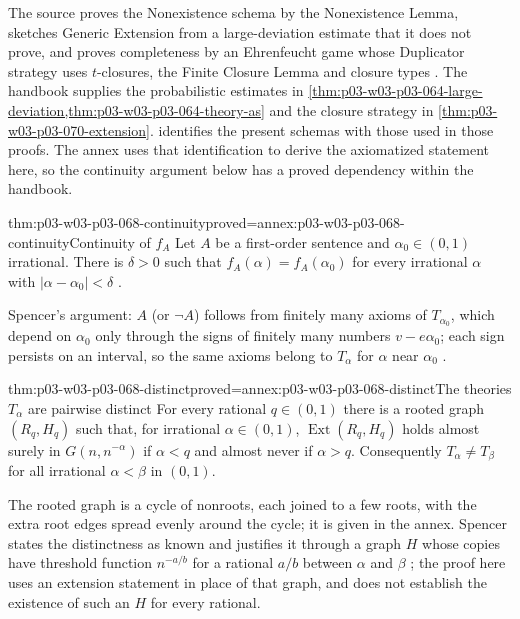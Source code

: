 The source proves the Nonexistence schema by the Nonexistence Lemma, sketches
Generic Extension from a large-deviation estimate that it does not prove, and
proves completeness by an Ehrenfeucht game whose Duplicator strategy uses
\(t\)-closures, the Finite Closure Lemma and closure types
\cite[pp.~10--12]{Spencer2007LogicRandomStructuresAuthor}.  The handbook
supplies the probabilistic estimates in
\cref{thm:p03-w03-p03-064-large-deviation,thm:p03-w03-p03-064-theory-as}
and the closure strategy in \cref{thm:p03-w03-p03-070-extension}.
 identifies the present schemas
with those used in those proofs.  The annex uses that identification to
derive the axiomatized statement here, so the continuity argument below
has a proved dependency within the handbook.

\begin{hbtheorem}{thm:p03-w03-p03-068-continuity}{proved=annex:p03-w03-p03-068-continuity}{Continuity of \(f_A\)}
Let \(A\) be a first-order sentence and \(\alpha_0\in(0,1)\) irrational.
There is \(\delta>0\) such that \(f_A(\alpha)=f_A(\alpha_0)\) for every
irrational \(\alpha\) with \(|\alpha-\alpha_0|<\delta\)
\cite[p.~15]{Spencer2007LogicRandomStructuresAuthor}.
\end{hbtheorem}

Spencer's argument: \(A\) (or \(\neg A\)) follows from finitely many axioms of
\(T_{\alpha_0}\), which depend on \(\alpha_0\) only through the signs of
finitely many numbers \(v-e\alpha_0\); each sign persists on an interval, so
the same axioms belong to \(T_\alpha\) for \(\alpha\) near \(\alpha_0\)
\cite[p.~15]{Spencer2007LogicRandomStructuresAuthor}.

\begin{hbtheorem}{thm:p03-w03-p03-068-distinct}{proved=annex:p03-w03-p03-068-distinct}{The theories \(T_\alpha\) are pairwise distinct}
For every rational \(q\in(0,1)\) there is a rooted graph \((R_q,H_q)\) such
that, for irrational \(\alpha\in(0,1)\), \(\operatorname{Ext}(R_q,H_q)\) holds
almost surely in \(G(n,n^{-\alpha})\) if \(\alpha<q\) and almost never if
\(\alpha>q\).  Consequently \(T_\alpha\neq T_\beta\) for all irrational
\(\alpha<\beta\) in \((0,1)\).
\end{hbtheorem}

The rooted graph is a cycle of nonroots, each joined to a few roots, with
the extra root edges spread evenly around the cycle; it is given in the
annex.  Spencer states the distinctness as known and justifies it through a
graph \(H\) whose copies have threshold function \(n^{-a/b}\) for a rational
\(a/b\) between \(\alpha\) and \(\beta\) \cite[p.~15]{Spencer2007LogicRandomStructuresAuthor};
the proof here uses an extension statement in place of that graph, and does
not establish the existence of such an \(H\) for every rational.

